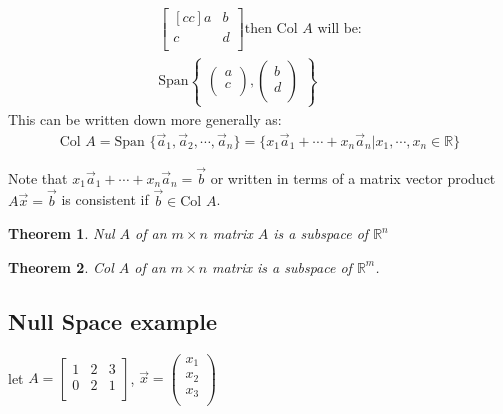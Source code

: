 \documentclass[11pt, a4paper]{article}
\newcommand*{\R}{\ensuremath{\mathbb{R}}}
\newtheorem{theorem}{Theorem}
\begin{document}
\begin{gather*}
  \begin{bmatrix}[cc]
    a & b\\
    c & d\\
  \end{bmatrix}
  \text{then Col $A$ will be:}\\
  \text{Span} \begin{Bmatrix} \begin{pmatrix} a\\ c\\ \end{pmatrix}, \begin{pmatrix} b\\ d\\ \end{pmatrix} \end{Bmatrix}
\end{gather*}
This can be written down more generally as:
\begin{gather*}
  \text{Col } A = \text{Span } \{ \vec{a}_1, \vec{a}_2, \cdots, \vec{a}_n \} = \{ x_1\vec{a}_1 + \cdots + x_n\vec{a}_n | x_1, \cdots, x_n \in \R \} 
\end{gather*}

Note that $x_1\vec{a}_1 + \cdots + x_n\vec{a}_n = \vec{b}$ or written in terms
of a matrix vector product $A\vec{x} = \vec{b}$ is consistent if $\vec{b} \in \text{Col }A$.

\begin{theorem}
  Nul $A$ of an $m \times n$ matrix $A$ is a subspace of $\R^n$
\end{theorem}

\begin{theorem}
  Col $A$ of an $m \times n$ matrix is a subspace of $\R^m$.
\end{theorem}

\subsection{Null Space example}
let $A = \begin{bmatrix} 1 & 2 & 3\\ 0 & 2 & 1\\ \end{bmatrix}$, $\vec{x} =\begin{pmatrix} x_1 \\ x_2 \\ x_3\\ \end{pmatrix}$
\end{document}
